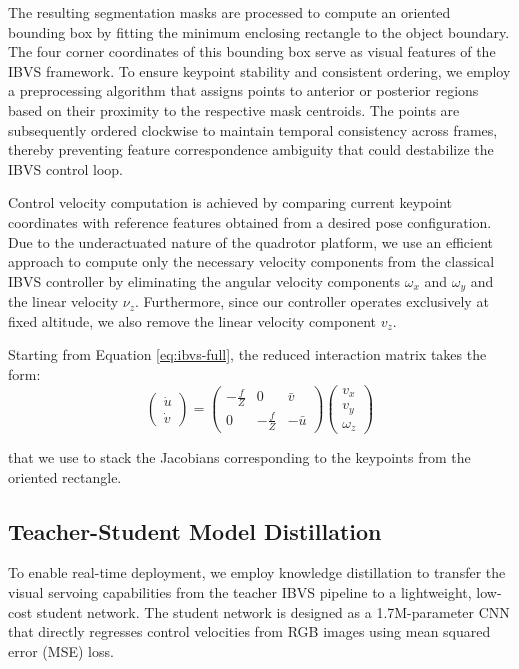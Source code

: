 \documentclass[10pt,twocolumn,letterpaper]{article}
\begin{document}
The resulting segmentation masks are processed to compute an oriented bounding box by fitting the minimum enclosing rectangle to the object boundary. The four corner coordinates of this bounding box serve as visual features of the IBVS framework. To ensure keypoint stability and consistent ordering, we employ a preprocessing algorithm that assigns points to anterior or posterior regions based on their proximity to the respective mask centroids. The points are subsequently ordered clockwise to maintain temporal consistency across frames, thereby preventing feature correspondence ambiguity that could destabilize the IBVS control loop.

Control velocity computation is achieved by comparing current keypoint coordinates with reference features obtained from a desired pose configuration. Due to the underactuated nature of the quadrotor platform, we use an efficient approach to compute only the necessary velocity components from the classical IBVS controller by eliminating the angular velocity components $\omega_x$ and $\omega_y$ and the linear velocity $\nu_z$. Furthermore, since our controller operates exclusively at fixed altitude, we also remove the linear velocity component $v_z$. 

Starting from Equation \ref{eq:ibvs-full}, the reduced interaction matrix takes the form:
\begin{equation}
\label{eq:numerical-stable-efficient-reduced-ibvs}
\begin{pmatrix}
\dot{u} \\
\dot{v}
\end{pmatrix} = \begin{pmatrix}
-\frac{f}{Z} & 0 & \bar{v} \\
0 & -\frac{f}{Z} & -\bar{u}
\end{pmatrix} \begin{pmatrix}
v_x \\
v_y \\
\omega_z
\end{pmatrix}
\end{equation}

that we use to stack the Jacobians corresponding to the keypoints from the oriented rectangle.

\subsection{Teacher-Student Model Distillation}
\label{sec:know_dist}

To enable real-time deployment, we employ knowledge distillation \cite{hinton2015distillingknowledgeneuralnetwork} to transfer the visual servoing capabilities from the teacher IBVS pipeline to a lightweight, low-cost student network. The student network is designed as a 1.7M-parameter CNN that directly regresses control velocities from RGB images using mean squared error (MSE) loss.
\end{document}
